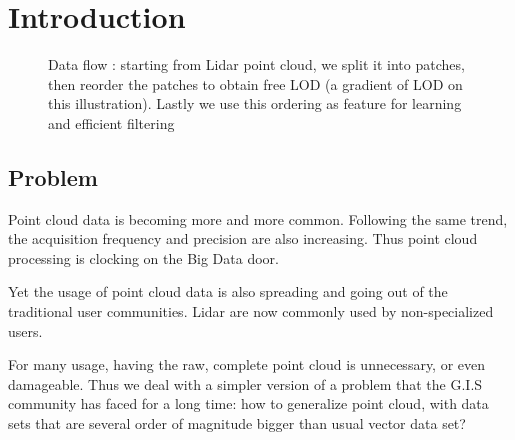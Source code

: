 

\section{Introduction}

\begin{figure}[t!]
	\begin{center}
		\caption{Data flow : starting from Lidar point cloud, we split it into patches, then reorder the patches to obtain free LOD (a gradient of LOD on this illustration). Lastly we use this ordering as feature for learning and efficient filtering} 
		\label{fig:banner_image}
	\end{center}
\end{figure} 

	\subsection{Problem}  
		Point cloud data is becoming more and more common. Following the same trend, the acquisition frequency and precision are also increasing.
		Thus point cloud processing is clocking on the Big Data door.
		
		Yet the usage of point cloud data is also spreading and going out of the traditional user communities. 
		Lidar are now commonly used by non-specialized users. 
		
		
		For many usage, having the raw, complete point cloud is unnecessary, or even damageable.
		Thus we deal with a simpler version of a problem that the G.I.S community has faced for a long time: how to generalize point cloud, with data sets that are several order of magnitude bigger than usual vector data set?
		
